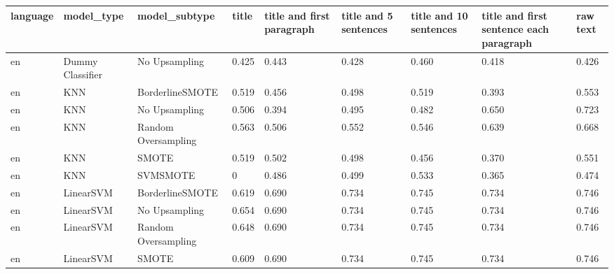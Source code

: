 \begin{tabular}{lllllllll}
\toprule
language &                   model\_type &       model\_subtype & title & title and first paragraph & title and 5 sentences & title and 10 sentences & title and first sentence each paragraph &  raw text \\
\midrule
      en &             Dummy Classifier &       No Upsampling & 0.425 &                     0.443 &                 0.428 &                  0.460 &                                   0.418 &     0.426 \\
      en &                          KNN &     BorderlineSMOTE & 0.519 &                     0.456 &                 0.498 &                  0.519 &                                   0.393 &     0.553 \\
      en &                          KNN &       No Upsampling & 0.506 &                     0.394 &                 0.495 &                  0.482 &                                   0.650 &     0.723 \\
      en &                          KNN & Random Oversampling & 0.563 &                     0.506 &                 0.552 &                  0.546 &                                   0.639 &     0.668 \\
      en &                          KNN &               SMOTE & 0.519 &                     0.502 &                 0.498 &                  0.456 &                                   0.370 &     0.551 \\
      en &                          KNN &            SVMSMOTE &     0 &                     0.486 &                 0.499 &                  0.533 &                                   0.365 &     0.474 \\
      en &                    LinearSVM &     BorderlineSMOTE & 0.619 &                     0.690 &                 0.734 &                  0.745 &                                   0.734 &     0.746 \\
      en &                    LinearSVM &       No Upsampling & 0.654 &                     0.690 &                 0.734 &                  0.745 &                                   0.734 &     0.746 \\
      en &                    LinearSVM & Random Oversampling & 0.648 &                     0.690 &                 0.734 &                  0.745 &                                   0.734 &     0.746 \\
      en &                    LinearSVM &               SMOTE & 0.609 &                     0.690 &                 0.734 &                  0.745 &                                   0.734 &     0.746 \\

\end{tabular}
